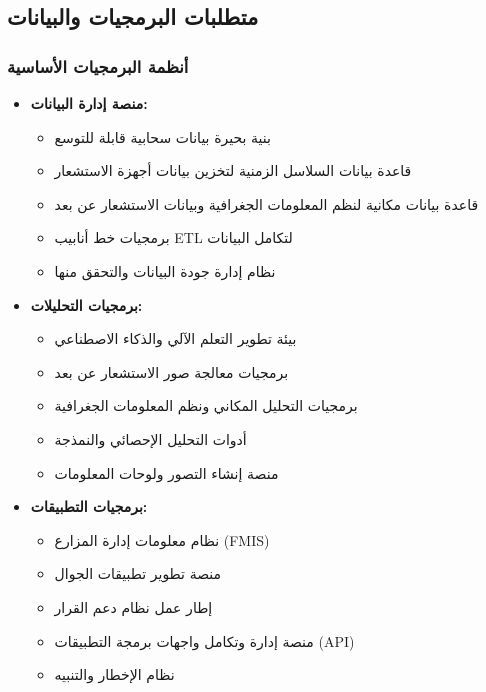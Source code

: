 \subsection{متطلبات البرمجيات والبيانات}

\subsubsection{أنظمة البرمجيات الأساسية}
\begin{itemize}
    \item \textbf{منصة إدارة البيانات:}
    \begin{itemize}
        \item بنية بحيرة بيانات سحابية قابلة للتوسع
        \item قاعدة بيانات السلاسل الزمنية لتخزين بيانات أجهزة الاستشعار
        \item قاعدة بيانات مكانية لنظم المعلومات الجغرافية وبيانات الاستشعار عن بعد
        \item برمجيات خط أنابيب ETL لتكامل البيانات
        \item نظام إدارة جودة البيانات والتحقق منها
    \end{itemize}
    
    \item \textbf{برمجيات التحليلات:}
    \begin{itemize}
        \item بيئة تطوير التعلم الآلي والذكاء الاصطناعي
        \item برمجيات معالجة صور الاستشعار عن بعد
        \item برمجيات التحليل المكاني ونظم المعلومات الجغرافية
        \item أدوات التحليل الإحصائي والنمذجة
        \item منصة إنشاء التصور ولوحات المعلومات
    \end{itemize}
    
    \item \textbf{برمجيات التطبيقات:}
    \begin{itemize}
        \item نظام معلومات إدارة المزارع (FMIS)
        \item منصة تطوير تطبيقات الجوال
        \item إطار عمل نظام دعم القرار
        \item منصة إدارة وتكامل واجهات برمجة التطبيقات (API)
        \item نظام الإخطار والتنبيه
    \end{itemize}
\end{itemize}

